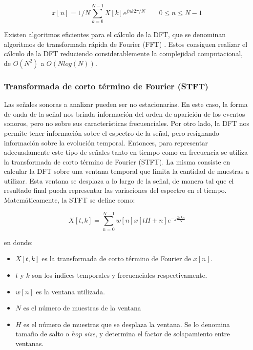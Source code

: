 \begin{equation}
\label{eqn:furier2}
	x[n] = {1}/{N}\sum_{k=0}^{N-1} X[k]e^{jnk2\pi/N} \qquad  0\leq n \leq N-1
\end{equation} 

Existen algoritmos eficientes para el cálculo de la DFT, que se denominan algoritmos de transformada rápida de Fourier (FFT) \cite{fft}. Estos consiguen realizar el cálculo de la DFT reduciendo considerablemente la complejidad computacional, de $O(N^{2})$ a $O(Nlog(N))$.

\subsubsection{Transformada de corto término de Fourier (STFT)}

Las señales sonoras a analizar pueden ser no estacionarias. En este caso, la forma de onda de la señal nos brinda información del orden de aparición de los eventos sonoros, pero no sobre sus características frecuenciales. Por otro lado, la DFT nos permite tener información sobre el espectro de la señal, pero resignando información sobre la evolución temporal. Entonces, para representar adecuadamente este tipo de señales tanto en tiempo como en frecuencia se utiliza la transformada de corto término de Fourier (STFT). La misma consiste en calcular la DFT sobre una ventana temporal que limita la cantidad de muestras a utilizar. Esta ventana se desplaza a lo largo de la señal, de manera tal que el resultado final pueda representar las variaciones del espectro en el tiempo. Matemáticamente, la STFT se define como: 

\begin{equation}
\label{eqn:STFT}
	X[t,k] = \sum_{n = 0}^{N-1}w[n]x[tH+n]e^{-j\frac{2 \pi k n}{N}}
\end{equation}

en donde:

\begin{itemize}
    \item $X[t,k]$ es la transformada de corto término de Fourier de $x[n]$.
    \item $t$ y $k$ son los indices temporales y frecuenciales respectivamente.
    \item $w[n]$ es la ventana utilizada.
    \item $N$ es el número de muestras de la ventana
    \item $H$ es el número de muestras que se desplaza la ventana. Se lo denomina tamaño de salto o \textit{hop size}, y determina el factor de solapamiento entre ventanas. 
\end{itemize}


